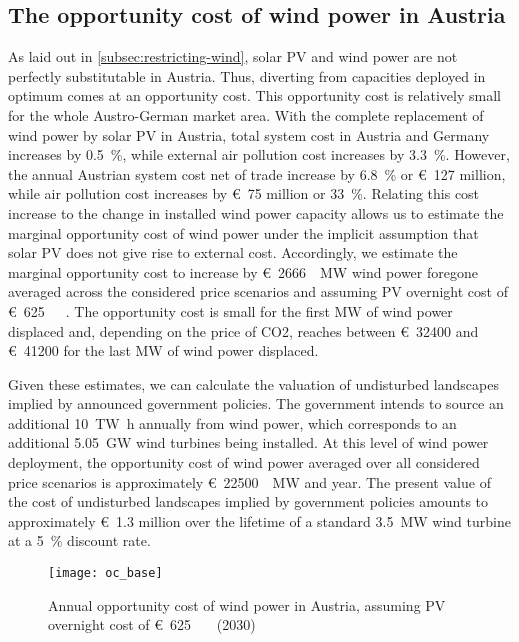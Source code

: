 \documentclass[review, 3p, times, 12pt, authoryear]{elsarticle}
\begin{document}
    \subsection{The opportunity cost of wind power in Austria} \label{subsec:opportunity-cost-wind}
    As laid out in \autoref{subsec:restricting-wind}, solar PV and wind power are not perfectly substitutable in Austria.
    Thus, diverting from capacities deployed in optimum comes at an opportunity cost.
    This opportunity cost is relatively small for the whole Austro-German market area.
    With the complete replacement of wind power by solar PV in Austria, total system cost in Austria and Germany increases by \SI{0.5}{\percent}, while external air pollution cost increases by \SI{3.3}{\percent}.
    However, the annual Austrian system cost net of trade increase by \SI{6.8}{\percent} or \SI{127}[\euro]{} million, while air pollution cost increases by \SI{75}[\euro]{} million or \SI{33}{\percent}.
    Relating this cost increase to the change in installed wind power capacity allows us to estimate the marginal opportunity cost of wind power under the implicit assumption that solar PV does not give rise to external cost.
    Accordingly, we estimate the marginal opportunity cost to increase by \SI[per-mode=symbol,sticky-per, bracket-unit-denominator=false]{2666}[\euro]{\per\mega\watt} wind power foregone averaged across the considered  price scenarios and assuming PV overnight cost of \SI[per-mode=symbol,sticky-per, bracket-unit-denominator=false]{625}[\euro]{\per\mega\wattpeak}.
    The opportunity cost is small for the first MW of wind power displaced and, depending on the price of CO2, reaches between \SI{32400}[\euro]{} and \SI{41200}[\euro]{} for the last \si{\mega\watt} of wind power displaced.

    Given these estimates, we can calculate the valuation of undisturbed landscapes implied by announced government policies.
    The government intends to source an additional \SI{10}{\tera\watt\hour} annually from wind power, which corresponds to an additional \SI{5.05}{\giga\watt} wind turbines being installed.
    At this level of wind power deployment, the opportunity cost of wind power averaged over all considered  price scenarios is approximately \SI[per-mode=symbol,sticky-per, bracket-unit-denominator=false]{22500}[\euro]{\per\mega\watt} and year.
    The present value of the cost of undisturbed landscapes implied by government policies amounts to approximately \SI{1.3}[\euro]{} million over the lifetime of a standard \SI{3.5}{\mega\watt} wind turbine at a \SI{5}{\percent} discount rate.
    \begin{figure*}[h!t]
        \centering
        \texttt{[image: oc\_base]}
        \caption{Annual opportunity cost of wind power in Austria, assuming PV overnight cost of \SI[per-mode=symbol,sticky-per, bracket-unit-denominator=false]{625}[\euro]{\per\kilo\wattpeak} (2030)}
        \label{fig:opportunity-cost-base}
    \end{figure*}
\end{document}
